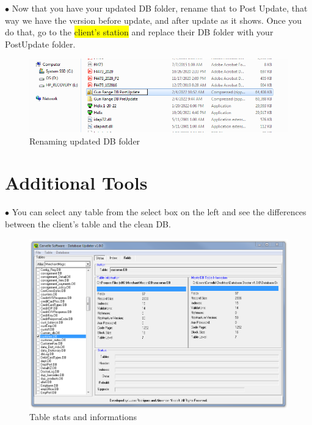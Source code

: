 \documentclass[a4paper, 11pt]{article}
\begin{document}
\pagebreak

\vspace*{\fill}
$\bullet$ Now that you have your updated DB folder, rename that to Post Update, that way we have the version before update, and after update as it shows. Once you do that, go to the \colorbox{yellow}{client's station} and replace their DB folder with your PostUpdate folder. 
\begin{figure}[h]
    \centering
     \includegraphics[width=\textwidth]{capture 42}
    \caption{Renaming updated DB folder}
\end{figure}
\vspace*{\fill}

\pagebreak

\section{Additional Tools}
$\bullet$ You can select any table from the select box on the left and see the differences between the client's table and the clean DB.
\begin{figure}[h]
    \centering
     \includegraphics[width=\textwidth]{capture 31}
    \caption{Table stats and informations}
\end{figure}
\end{document}
